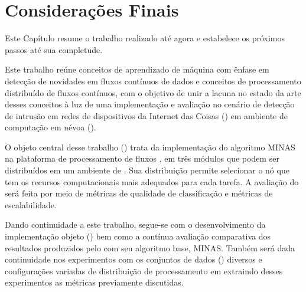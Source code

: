 \chapter{Considerações Finais}\label{cha:final}

\begin{resumocap}
  Este Capítulo resume o trabalho realizado até agora e estabelece
  os próximos passos até sua completude.
\end{resumocap}

Este trabalho reúne conceitos de aprendizado de máquina com ênfase em detecção
de novidades em fluxos contínuos de dados e conceitos de processamento
distribuído de fluxos contínuos, com o objetivo de unir a lacuna no estado da
arte desses conceitos à luz de uma implementação e avaliação no cenário de
detecção de intrusão em redes de dispositivos da Internet das Coisas (\iot) em
ambiente de computação em névoa (\fog).

O objeto central desse trabalho (\mfog) trata da implementação do algoritmo MINAS na
plataforma de processamento de fluxos \flink, em três módulos que podem ser
distribuídos em um ambiente de \fog.
Sua distribuição permite selecionar o nó que tem os recursos computacionais mais
adequados para cada tarefa.
A avaliação do \mfog será feita por meio de métricas de qualidade de classificação
e métricas de escalabilidade.


Dando continuidade a este trabalho, segue-se com o desenvolvimento da implementação objeto
(\mfog) bem como a contínua avaliação comparativa dos resultados
produzidos pelo \mfog com seu algoritmo base, MINAS.
Também será dada continuidade nos experimentos com os conjuntos de dados (\datasets)
diversos e configurações variadas de distribuição de processamento em \fog
extraindo desses experimentos as métricas previamente discutidas.





